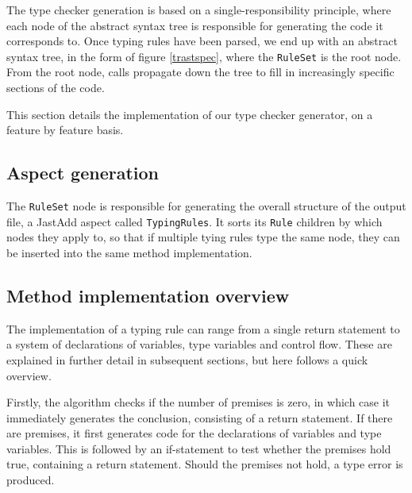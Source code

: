\documentclass[nofilelist]{cslthse-msc}
\begin{document}
The type checker generation is based on a single-responsibility principle, where each node of the abstract syntax tree is responsible for generating the code it corresponds to.
Once typing rules have been parsed, we end up with an abstract syntax tree, in the form of figure \ref{trastspec}, where the \verb|RuleSet| is the root node.
From the root node, calls propagate down the tree to fill in increasingly specific sections of the code.

This section details the implementation of our type checker generator, on a feature by feature basis.


\subsection{Aspect generation}
The \verb|RuleSet| node is responsible for generating the overall structure of the output file, a JastAdd aspect called \verb|TypingRules|.
It sorts its \verb|Rule| children by which nodes they apply to, so that if multiple tying rules type the same node, they can be inserted into the same method implementation.

\subsection{Method implementation overview}
The implementation of a typing rule can range from a single return statement to a system of declarations of variables, type variables and control flow.
These are explained in further detail in subsequent sections, but here follows a quick overview.

Firstly, the algorithm checks if the number of premises is zero, in which case it immediately generates the conclusion, consisting of a return statement.
If there are premises, it first generates code for the declarations of variables and type variables.
This is followed by an if-statement to test whether the premises hold true, containing a return statement.
Should the premises not hold, a type error is produced.
\end{document}
